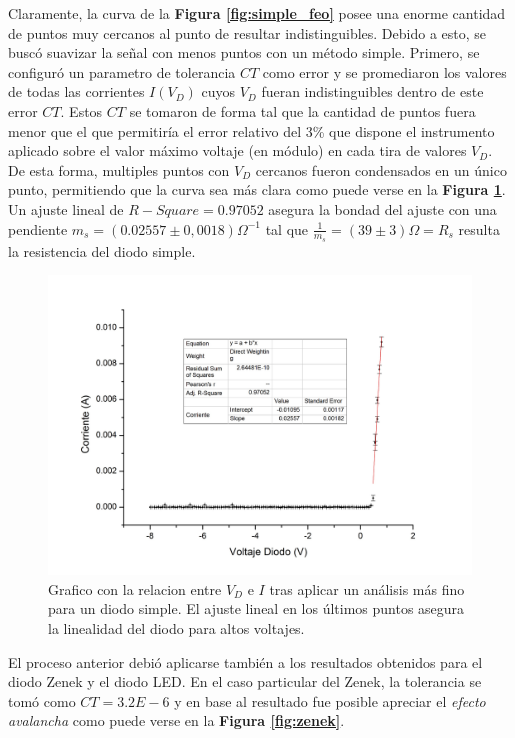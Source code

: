\documentclass[11pt,a4paper]{article}
\begin{document}
Claramente, la curva de la \textbf{Figura \ref{fig:simple_feo}} posee una enorme cantidad de puntos muy cercanos al punto de resultar indistinguibles. Debido a esto, se buscó suavizar la señal con menos puntos con un método simple. Primero, se configuró un parametro de tolerancia $CT$ como error y se promediaron los valores de todas las corrientes $I(V_D)$ cuyos $V_D$ fueran indistinguibles dentro de este error $CT$. Estos $CT$ se tomaron de forma tal que la cantidad de puntos fuera menor que el que permitiría el error relativo del 3\% que dispone el instrumento aplicado sobre el valor máximo voltaje (en módulo) en cada tira de valores $V_D$. De esta forma, multiples puntos con $V_D$ cercanos fueron condensados en un único punto, permitiendo que la curva sea más clara como puede verse en la \textbf{Figura \ref{fig:simple_mejor}}. Un ajuste lineal de $R-Square = 0.97052$ asegura la bondad del ajuste con una pendiente $m_s = (0.02557 \pm 0,0018)\Omega^{-1}$ tal que $\frac{1}{m_s} = (39 \pm 3)\Omega= R_s$ resulta la resistencia del diodo simple.

\begin{figure}[H]
\centering
\includegraphics[scale=0.36]{simple_mejor}
   \caption{Grafico con la relacion entre $V_D$ e $I$ tras aplicar un análisis más fino para un diodo simple. El ajuste lineal en los últimos puntos asegura la linealidad del diodo para altos voltajes.}
   \label{fig:simple_mejor}
\end{figure}

El proceso anterior debió aplicarse también a los resultados obtenidos para el diodo Zenek y el diodo LED. En el caso particular del Zenek, la tolerancia se tomó como $CT = 3.2E-6$ y en base al resultado fue posible apreciar el \textit{efecto avalancha} como puede verse en la \textbf{Figura \ref{fig:zenek}}. 
\end{document}
